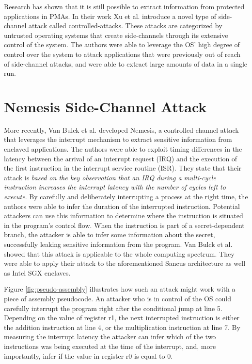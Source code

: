 Research has shown that it is still possible to extract information from protected applications in PMAs. In their work Xu et al. \cite{Xu} introduce a novel type of side-channel attack 
called controlled-attacks. These attacks are categorized by untrusted operating systems that create side-channels through its extensive control of the system.
The authors were able to leverage the OS' high degree of control over the system to attack applications that were previously out of reach of side-channel attacks, and were able to 
extract large amounts of data in a single run. 

\section{Nemesis Side-Channel Attack}
\label{sec:nemesis}
More recently, Van Bulck et al. \cite{Nemesis} developed Nemesis, a controlled-channel attack that leverages the interrupt mechanism to extract sensitive information from 
enclaved applications. The authors were able to exploit timing differences in the latency between the arrival of an interrupt request (IRQ) and the execution of the first instruction in the 
interrupt service routine (ISR). They state that their attack is \textit{based on the key observation that an IRQ during a multi-cycle instruction increases the interrupt 
latency with the number of cycles left to execute}. By carefully and deliberately interrupting a process at the right time, the authors were able to infer the duration of the interrupted instruction. 
Potential attackers can use this information to determine where the instruction is situated in the program's control flow. When the instruction is part of a secret-dependent branch, the 
attacker is able to infer some information about the secret, successfully leaking sensitive information from the program. Van Bulck et al. \cite{Nemesis} showed that this attack is applicable to 
the whole computing spectrum. They were able to apply their attack to the aforementioned Sancus architecture as well as Intel SGX enclaves.  

Figure \ref{fig:pseudo-assembly} illustrates how such an attack might work with a piece of assembly pseudocode. An attacker who is in control of the OS could carefully interrupt the program right
after the conditional jump at line 5. Depending on the value of register r1, the next interrupted instruction is either the addition instruction at line 4, or the multiplication instruction at line 7. 
By measuring the interrupt latency the attacker can infer which of the two instructions was being executed at the time of the interrupt, and, more importantly, infer if the value in register r0 is equal to 0. 



